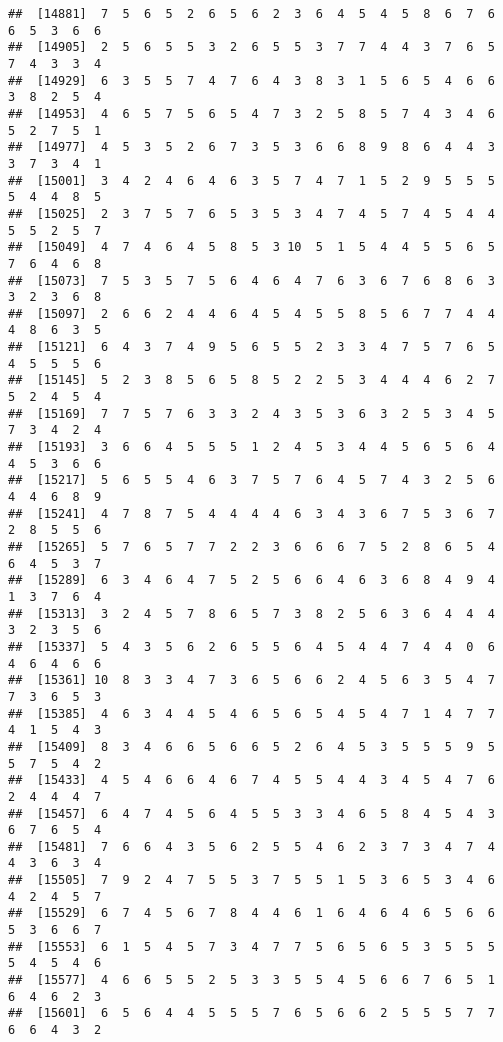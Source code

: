 \documentclass[
]{book}
\begin{document}
\begin{verbatim}
##  [14881]  7  5  6  5  2  6  5  6  2  3  6  4  5  4  5  8  6  7  6  6  5  3  6  6
##  [14905]  2  5  6  5  5  3  2  6  5  5  3  7  7  4  4  3  7  6  5  7  4  3  3  4
##  [14929]  6  3  5  5  7  4  7  6  4  3  8  3  1  5  6  5  4  6  6  3  8  2  5  4
##  [14953]  4  6  5  7  5  6  5  4  7  3  2  5  8  5  7  4  3  4  6  5  2  7  5  1
##  [14977]  4  5  3  5  2  6  7  3  5  3  6  6  8  9  8  6  4  4  3  3  7  3  4  1
##  [15001]  3  4  2  4  6  4  6  3  5  7  4  7  1  5  2  9  5  5  5  5  4  4  8  5
##  [15025]  2  3  7  5  7  6  5  3  5  3  4  7  4  5  7  4  5  4  4  5  5  2  5  7
##  [15049]  4  7  4  6  4  5  8  5  3 10  5  1  5  4  4  5  5  6  5  7  6  4  6  8
##  [15073]  7  5  3  5  7  5  6  4  6  4  7  6  3  6  7  6  8  6  3  3  2  3  6  8
##  [15097]  2  6  6  2  4  4  6  4  5  4  5  5  8  5  6  7  7  4  4  4  8  6  3  5
##  [15121]  6  4  3  7  4  9  5  6  5  5  2  3  3  4  7  5  7  6  5  4  5  5  5  6
##  [15145]  5  2  3  8  5  6  5  8  5  2  2  5  3  4  4  4  6  2  7  5  2  4  5  4
##  [15169]  7  7  5  7  6  3  3  2  4  3  5  3  6  3  2  5  3  4  5  7  3  4  2  4
##  [15193]  3  6  6  4  5  5  5  1  2  4  5  3  4  4  5  6  5  6  4  4  5  3  6  6
##  [15217]  5  6  5  5  4  6  3  7  5  7  6  4  5  7  4  3  2  5  6  4  4  6  8  9
##  [15241]  4  7  8  7  5  4  4  4  4  6  3  4  3  6  7  5  3  6  7  2  8  5  5  6
##  [15265]  5  7  6  5  7  7  2  2  3  6  6  6  7  5  2  8  6  5  4  6  4  5  3  7
##  [15289]  6  3  4  6  4  7  5  2  5  6  6  4  6  3  6  8  4  9  4  1  3  7  6  4
##  [15313]  3  2  4  5  7  8  6  5  7  3  8  2  5  6  3  6  4  4  4  3  2  3  5  6
##  [15337]  5  4  3  5  6  2  6  5  5  6  4  5  4  4  7  4  4  0  6  4  6  4  6  6
##  [15361] 10  8  3  3  4  7  3  6  5  6  6  2  4  5  6  3  5  4  7  7  3  6  5  3
##  [15385]  4  6  3  4  4  5  4  6  5  6  5  4  5  4  7  1  4  7  7  4  1  5  4  3
##  [15409]  8  3  4  6  6  5  6  6  5  2  6  4  5  3  5  5  5  9  5  5  7  5  4  2
##  [15433]  4  5  4  6  6  4  6  7  4  5  5  4  4  3  4  5  4  7  6  2  4  4  4  7
##  [15457]  6  4  7  4  5  6  4  5  5  3  3  4  6  5  8  4  5  4  3  6  7  6  5  4
##  [15481]  7  6  6  4  3  5  6  2  5  5  4  6  2  3  7  3  4  7  4  4  3  6  3  4
##  [15505]  7  9  2  4  7  5  5  3  7  5  5  1  5  3  6  5  3  4  6  4  2  4  5  7
##  [15529]  6  7  4  5  6  7  8  4  4  6  1  6  4  6  4  6  5  6  6  5  3  6  6  7
##  [15553]  6  1  5  4  5  7  3  4  7  7  5  6  5  6  5  3  5  5  5  5  4  5  4  6
##  [15577]  4  6  6  5  5  2  5  3  3  5  5  4  5  6  6  7  6  5  1  6  4  6  2  3
##  [15601]  6  5  6  4  4  5  5  5  7  6  5  6  6  2  5  5  5  7  7  6  6  4  3  2

\end{verbatim}
\end{document}
